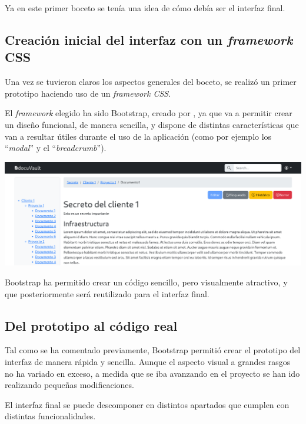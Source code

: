 \documentclass{\ClassPath/viu-tfm-template}
\begin{document}
\vspace{-15pt}
Ya en este primer boceto se tenía una idea de cómo debía ser el interfaz final.

\subsection{Creación inicial del interfaz con un \textit{framework} CSS}
Una vez se tuvieron claros los aspectos generales del boceto, se realizó un primer prototipo haciendo uso de un \textit{framework CSS}.

El \textit{framework} elegido ha sido Bootstrap, creado por \textcite{bootstrap}, ya que va a permitir crear un diseño funcional, de manera sencilla, y dispone de distintas características que  van a resultar útiles durante el uso de la aplicación (como por ejemplo los “\textit{modal}” y el “\textit{breadcrumb}”).

\begin{center}
    \includegraphics[frame,width=\linewidth]{img/boceto2.png}
    \vspace{-20pt}
\end{center}

\vspace{-10pt}
Bootstrap ha permitido crear un código sencillo, pero visualmente atractivo, y que posteriormente será reutilizado para el interfaz final.


\subsection{Del prototipo al código real}

Tal como se ha comentado previamente, Bootstrap permitió crear el prototipo del interfaz de manera rápida y sencilla. Aunque el aspecto visual a grandes rasgos no ha variado en exceso, a medida que se iba avanzando en el proyecto se han ido realizando pequeñas modificaciones.

El interfaz final se puede descomponer en distintos apartados que cumplen con distintas funcionalidades.
\end{document}
